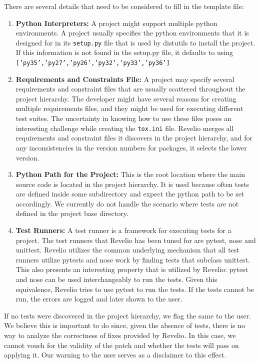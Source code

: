 There are several details that need to be considered to fill in the template file:
\begin{enumerate}
    \item \textbf{Python Interpreters:} A project might support multiple python environments. A project usually specifies the python environments that it is designed for in its \texttt{setup.py} file that is used by distutils to install the project. If this information is not found in the setup.py file, it defaults to using \texttt{['py35','py27','py26','py32','py33','py36']}
    \item \textbf{Requirements and Constraints File:}  A project may specify several requirements and constraint files that are usually scattered throughout the project hierarchy. The developer might have several reasons for creating multiple requirements files, and they might be used for executing different test suites. The uncertainty in knowing how to use these files poses an interesting challenge while creating the \texttt{tox.ini} file. Revelio merges all requirements and constraint files it discovers in the project hierarchy, and for any inconsistencies in the version numbers for packages, it selects the lower version.
    \item \textbf{Python Path for the Project:} This is the root location where the main source code is located in the project hierarchy. It is used because often tests are defined inside some subdirectory and expect the python path to be set accordingly. We currently do not handle the scenario where tests are not defined in the project base directory.
    \item \textbf{Test Runners:} A test runner is a framework for executing tests for a project. The test runners that Revelio has been tuned for are pytest, nose and unittest. Revelio utilizes the common underlying mechanism that all test runners utilize pytests and nose work by finding tests that subclass unittest. This also presents an interesting property that is utilized by Revelio: pytest and nose can be used interchangeably to run the tests. Given this equivalence, Revelio tries to use pytest to run the tests. If the tests cannot be run, the errors are logged and later shown to the user.  
\end{enumerate}

If no tests were discovered in the project hierarchy, we flag the same to the user. We believe this is important to do since, given the absence of tests, there is no way to analyze the correctness of fixes provided by Revelio. In this case, we cannot vouch for the validity of the patch and whether the tests will pass on applying it. Our warning to the user serves as a disclaimer to this effect. 


